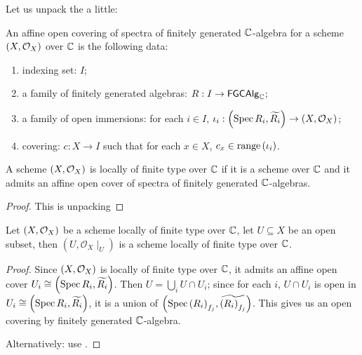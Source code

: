 Let us unpack the  a little:


\begin{definition}
  An affine open covering of spectra of finitely generated $\mathbb{C}$-algebra for a scheme $\left(X, \mathcal{O}_{X}\right)$ over $\mathbb{C}$ is the following data:
    \begin{enumerate}
        \item indexing set: $I$;
        \item a family of finitely generated algebras: $R : I \to \mathsf{FGCAlg}_{\mathbb{C}}$;
        \item a family of open immersions: for each $i \in I$, $\iota_i: \left(\operatorname*{Spec}{R_i}, \widetilde{R_i}\right) \to \left(X, \mathcal{O}_{X}\right)$;
        \item covering: $c : X \to I$ such that for each $x \in X$, $c_x \in \operatorname*{range}\left({\iota_i}\right)$.
    \end{enumerate}
\end{definition}

\begin{lemma}
    A scheme $\left(X, \mathcal{O}_{X}\right)$ is locally of finite type over $\mathbb{C}$ if it is a scheme over $\mathbb{C}$ and it admits an affine open cover of spectra of finitely generated $\mathbb{C}$-algebras.
\end{lemma}

\begin{proof}
    This is unpacking 
\end{proof}


\begin{proposition}
  Let $\left(X, \mathcal{O}_{X}\right)$ be a scheme locally of finite type over $\mathbb{C}$, let $U \subseteq X$ be an open subset, then $(U, \mathcal{O}_{X}\mid_{U})$ is a scheme locally of finite type over $\mathbb{C}$.
  \label{thm:restriction-of-scheme-of-finite-type-is-scheme-of-finite-type}
\end{proposition}
\begin{proof}
  Since $\left(X, \mathcal{O}_{X}\right)$ is locally of finite type over $\mathbb{C}$, it admits an affine open cover $U_{i}\cong\left(\operatorname*{Spec}{R_{i}}, \widetilde{R_{i}}\right)$.
  Then $U = \bigcup_{i} U \cap U_{i}$; since for each $i$, $U \cap U_{i}$ is open in $U_{i} \cong \left(\operatorname*{Spec}{R_{i}}, \widetilde{R_{i}}\right)$, it is a union of $\left(\operatorname*{Spec}{{\left(R_{i}\right)}_{f_{j}}}, \widetilde{{\left(R_{i}\right)}_{f_{j}}}\right)$. This gives us an open covering by finitely generated $\mathbb{C}$-algebra.
  
  Alternatively: use .
\end{proof}

